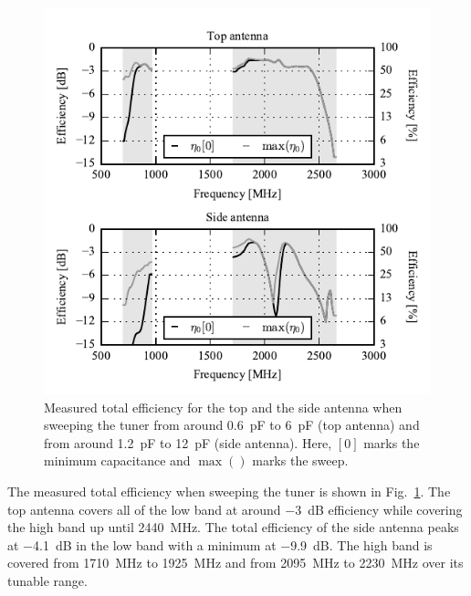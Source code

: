 \begin{figure}[tb]
    \centering
    \includegraphics{img/meas/efficiency}
    \caption{Measured total efficiency for the top and the side antenna when sweeping the tuner from around \SI{0.6}{pF} to \SI{6}{pF} (top antenna) and from around \SI{1.2}{pF} to \SI{12}{pF} (side antenna). Here, $[0]$ marks the minimum capacitance and $\max()$ marks the sweep.}
    \label{fig:meas_eff}
\end{figure}

The measured total efficiency when sweeping the tuner is shown in Fig.~\ref{fig:meas_eff}. The top antenna covers all of the low band at around \SI{-3}{dB} efficiency while covering the high band up until \SI{2440}{MHz}. The total efficiency of the side antenna peaks at \SI{-4.1}{dB} in the low band with a minimum at \SI{-9.9}{dB}. The high band is covered from \SI{1710}{MHz} to \SI{1925}{MHz} and from \SI{2095}{MHz} to \SI{2230}{MHz} over its tunable range.

